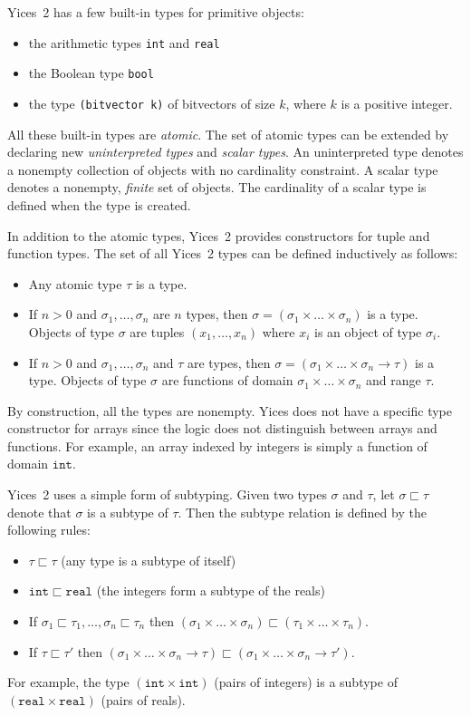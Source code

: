 \documentclass[11pt,twoside,fleqn,openright,titlepage]{cslreport}
\begin{document}
Yices~2 has a few built-in types for primitive objects:
\begin{itemize}
\item the arithmetic types \texttt{int} and \texttt{real}
\item the Boolean type \texttt{bool}
\item the type \texttt{(bitvector k)} of bitvectors of size $k$,
 where $k$ is a positive integer.
\end{itemize}
All these built-in  types are {\em atomic\/}. The  set of atomic types
can be extended by declaring  new {\em uninterpreted types\/} and {\em
  scalar types\/}. An uninterpreted type denotes a nonempty collection
of objects  with no  cardinality constraint. A  scalar type  denotes a
nonempty, {\em finite\/}  set of objects. The cardinality  of a scalar
type is defined when the type is created.

\medskip\noindent
In  addition to the  atomic types,  Yices~2 provides  constructors for
tuple and function types. The set  of all Yices~2 types can be defined
inductively as follows:
\begin{itemize}
\item Any atomic type $\tau$ is a type.
\item  If $n>0$  and  $\sigma_1,\ldots,\sigma_n$ are  $n$ types,  then
  $\sigma   =  (\sigma_1   \times  \ldots   \times  \sigma_n)$   is  a
  type. Objects of type  $\sigma$ are tuples $(x_1,\ldots, x_n)$ where
  $x_i$ is an object of type $\sigma_i$.
\item If  $n>0$ and  $\sigma_1,\ldots,\sigma_n$ and $\tau$  are types,
  then  $\sigma  =  (\sigma_1\times  \ldots\times\sigma_n  \rightarrow
  \tau)$ is a  type. Objects of type $\sigma$  are functions of domain
  $\sigma_1\times\ldots\times\sigma_n$ and range $\tau$.
\end{itemize}
By construction,  all the  types are nonempty.  Yices does not  have a
specific  type  constructor  for  arrays  since  the  logic  does  not
distinguish  between  arrays  and  functions. For  example,  an  array
indexed by integers is simply a function of domain $\mathtt{int}$.

\medskip\noindent
Yices~2 uses a simple form  of subtyping. Given two types $\sigma$ and
$\tau$, let $\sigma\sqsubset\tau$ denote that $\sigma$ is a subtype of
$\tau$. Then the subtype relation is defined by the following rules:
\begin{itemize}
\item $\tau\sqsubset\tau$ (any type is a subtype of itself)
\item   $\mathtt{int}\sqsubset\mathtt{real}$  (the  integers   form  a
  subtype of the reals)
\item If $\sigma_1\sqsubset\tau_1,\ldots,\sigma_n\sqsubset\tau_n$ then
$(\sigma_1\times \ldots\times\sigma_n)\sqsubset (\tau_1\times\ldots\times\tau_n)$.
\item If $\tau\sqsubset\tau'$ then
  $(\sigma_1\times\ldots\times\sigma_n\rightarrow\tau)\sqsubset
  (\sigma_1\times\ldots\times\sigma_n\rightarrow\tau')$.
\end{itemize}
For  example, the  type  $(\mathtt{int}\times\mathtt{int})$ (pairs  of
integers) is a  subtype of $(\mathtt{real}\times\mathtt{real})$ (pairs
of reals).
\end{document}
